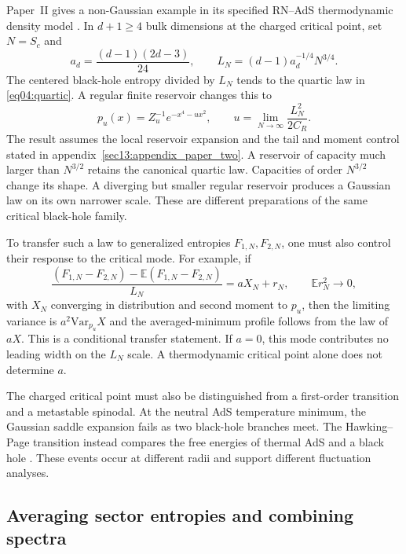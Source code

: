 \documentclass[11pt,letterpaper]{article}
\theoremstyle{plain}
\theoremstyle{definition}
\theoremstyle{remark}
\newcommand{\E}{\mathbb{E}}
\newcommand{\Var}{\text{Var}}
\begin{document}
Paper~II gives a non-Gaussian example in its specified RN--AdS
thermodynamic density model \cite{wuebben2026b}. In $d+1\geq4$ bulk
dimensions at the charged critical point, set $N=S_c$ and
\begin{equation}
 a_d=\frac{(d-1)(2d-3)}{24},\qquad
 L_N=(d-1)a_d^{-1/4}N^{3/4}.
 \label{eq04:critical_scale}
\end{equation}
The centered black-hole entropy divided by $L_N$ tends to the quartic
law in \eqref{eq04:quartic}. A regular finite reservoir changes this to
\begin{equation}
 p_u(x)=Z_u^{-1}e^{-x^4-ux^2},\qquad
 u=\lim_{N\to\infty}\frac{L_N^2}{2C_R}.
 \label{eq04:critical_bath}
\end{equation}
The result assumes the local reservoir expansion and the tail and
moment control stated in appendix~\ref{sec13:appendix_paper_two}.
A reservoir of capacity much larger than $N^{3/2}$ retains the canonical
quartic law. Capacities of order $N^{3/2}$ change its shape. A diverging
but smaller regular reservoir produces a Gaussian law on its own
narrower scale. These are different preparations of the same critical
black-hole family.

To transfer such a law to generalized entropies $F_{1,N},F_{2,N}$, one
must also control their response to the critical mode. For example, if
\begin{equation}
 \frac{(F_{1,N}-F_{2,N})-\E(F_{1,N}-F_{2,N})}{L_N}
 =aX_N+r_N,\qquad \E r_N^2\longrightarrow0,
 \label{eq04:response}
\end{equation}
with $X_N$ converging in distribution and second moment to $p_u$, then
the limiting variance is $a^2\Var_{p_u}X$ and the averaged-minimum
profile follows from the law of $aX$. This is a conditional transfer
statement. If $a=0$, this mode contributes no leading width on the
$L_N$ scale. A thermodynamic critical point alone does not determine $a$.

The charged critical point must also be distinguished from a first-order
transition and a metastable spinodal. At the neutral AdS temperature
minimum, the Gaussian saddle expansion fails as two black-hole branches
meet. The Hawking--Page transition instead compares the free energies
of thermal AdS and a black hole \cite{hawkingpage1983}. These events
occur at different radii and support different fluctuation analyses.

\subsection{Averaging sector entropies and combining spectra}
\end{document}
